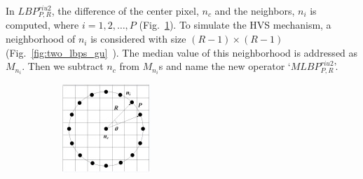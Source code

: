 In $LBP_{P, R}^{riu2}$, the difference of the center pixel, $n_c$ and the neighbors, $n_i$ is computed, where $i=1,2, \ldots, P$ (Fig.~\ref{fig:two_lbps_normal}). To simulate the HVS mechanism, a neighborhood of $n_i$ is considered with size $(R-1)\times(R-1)$ (Fig.~\ref{fig:two_lbps_gu}~\cite{Yue2018}). The median value of this neighborhood is addressed as $M_{n_i}$. Then we subtract $n_c$ from $M_{n_i}$s and name the new operator `$MLBP^{riu2}_{P, R}$'.
\begin{figure}
     \centering
     \begin{subfigure}[b]{0.25\textwidth}
         \centering
         \includegraphics[width= \textwidth]{./figs/lbp_nr}
         \caption{}
         \label{fig:two_lbps_normal}
     \end{subfigure}
     \hfill
     \begin{subfigure}[b]{0.3\textwidth}
         \centering

\end{subfigure}
\end{figure}
